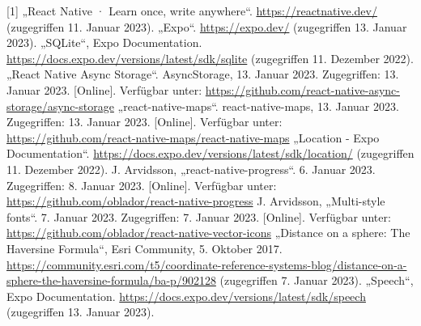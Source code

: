 \documentclass[12pt,oneside]{report}
\begin{document}
  \begin{thebibliography}{10}
     [1] „React Native · Learn once, write anywhere“. \url{https://reactnative.dev/} (zugegriffen 11. Januar 2023).
     „Expo“. \url{https://expo.dev/} (zugegriffen 13. Januar 2023).
     „SQLite“, Expo Documentation. \url{https://docs.expo.dev/versions/latest/sdk/sqlite} (zugegriffen 11. Dezember 2022).
     „React Native Async Storage“. AsyncStorage, 13. Januar 2023. Zugegriffen: 13. Januar 2023. [Online]. Verfügbar unter: \url{https://github.com/react-native-async-storage/async-storage}
     „react-native-maps“. react-native-maps, 13. Januar 2023. Zugegriffen: 13. Januar 2023. [Online]. Verfügbar unter: \url{https://github.com/react-native-maps/react-native-maps}
     „Location - Expo Documentation“. \url{https://docs.expo.dev/versions/latest/sdk/location/} (zugegriffen 11. Dezember 2022).
     J. Arvidsson, „react-native-progress“. 6. Januar 2023. Zugegriffen: 8. Januar 2023. [Online]. Verfügbar unter: \url{https://github.com/oblador/react-native-progress}
     J. Arvidsson, „Multi-style fonts“. 7. Januar 2023. Zugegriffen: 7. Januar 2023. [Online]. Verfügbar unter: \url{https://github.com/oblador/react-native-vector-icons}
     „Distance on a sphere: The Haversine Formula“, Esri Community, 5. Oktober 2017. \url{https://community.esri.com/t5/coordinate-reference-systems-blog/distance-on-a-sphere-the-haversine-formula/ba-p/902128} (zugegriffen 7. Januar 2023).
     „Speech“, Expo Documentation. \url{https://docs.expo.dev/versions/latest/sdk/speech} (zugegriffen 13. Januar 2023).
    
    
    
    
    
    
    
    
  \end{thebibliography}
  \newpage
  
  \listoffigures
  \newpage
  
  \lstlistoflistings
  \newpage

  
\end{document}

